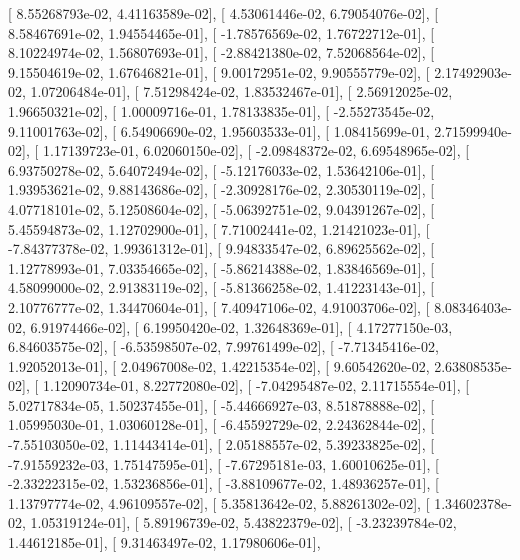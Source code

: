 \documentclass{article}
\begin{document}
       [  8.55268793e-02,   4.41163589e-02],
       [  4.53061446e-02,   6.79054076e-02],
       [  8.58467691e-02,   1.94554465e-01],
       [ -1.78576569e-02,   1.76722712e-01],
       [  8.10224974e-02,   1.56807693e-01],
       [ -2.88421380e-02,   7.52068564e-02],
       [  9.15504619e-02,   1.67646821e-01],
       [  9.00172951e-02,   9.90555779e-02],
       [  2.17492903e-02,   1.07206484e-01],
       [  7.51298424e-02,   1.83532467e-01],
       [  2.56912025e-02,   1.96650321e-02],
       [  1.00009716e-01,   1.78133835e-01],
       [ -2.55273545e-02,   9.11001763e-02],
       [  6.54906690e-02,   1.95603533e-01],
       [  1.08415699e-01,   2.71599940e-02],
       [  1.17139723e-01,   6.02060150e-02],
       [ -2.09848372e-02,   6.69548965e-02],
       [  6.93750278e-02,   5.64072494e-02],
       [ -5.12176033e-02,   1.53642106e-01],
       [  1.93953621e-02,   9.88143686e-02],
       [ -2.30928176e-02,   2.30530119e-02],
       [  4.07718101e-02,   5.12508604e-02],
       [ -5.06392751e-02,   9.04391267e-02],
       [  5.45594873e-02,   1.12702900e-01],
       [  7.71002441e-02,   1.21421023e-01],
       [ -7.84377378e-02,   1.99361312e-01],
       [  9.94833547e-02,   6.89625562e-02],
       [  1.12778993e-01,   7.03354665e-02],
       [ -5.86214388e-02,   1.83846569e-01],
       [  4.58099000e-02,   2.91383119e-02],
       [ -5.81366258e-02,   1.41223143e-01],
       [  2.10776777e-02,   1.34470604e-01],
       [  7.40947106e-02,   4.91003706e-02],
       [  8.08346403e-02,   6.91974466e-02],
       [  6.19950420e-02,   1.32648369e-01],
       [  4.17277150e-03,   6.84603575e-02],
       [ -6.53598507e-02,   7.99761499e-02],
       [ -7.71345416e-02,   1.92052013e-01],
       [  2.04967008e-02,   1.42215354e-02],
       [  9.60542620e-02,   2.63808535e-02],
       [  1.12090734e-01,   8.22772080e-02],
       [ -7.04295487e-02,   2.11715554e-01],
       [  5.02717834e-05,   1.50237455e-01],
       [ -5.44666927e-03,   8.51878888e-02],
       [  1.05995030e-01,   1.03060128e-01],
       [ -6.45592729e-02,   2.24362844e-02],
       [ -7.55103050e-02,   1.11443414e-01],
       [  2.05188557e-02,   5.39233825e-02],
       [ -7.91559232e-03,   1.75147595e-01],
       [ -7.67295181e-03,   1.60010625e-01],
       [ -2.33222315e-02,   1.53236856e-01],
       [ -3.88109677e-02,   1.48936257e-01],
       [  1.13797774e-02,   4.96109557e-02],
       [  5.35813642e-02,   5.88261302e-02],
       [  1.34602378e-02,   1.05319124e-01],
       [  5.89196739e-02,   5.43822379e-02],
       [ -3.23239784e-02,   1.44612185e-01],
       [  9.31463497e-02,   1.17980606e-01],
\end{document}
